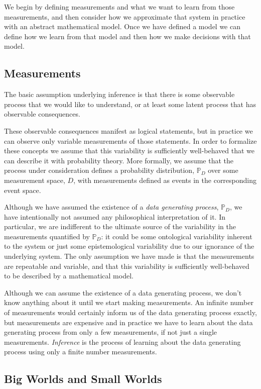 \documentclass[11pt, oneside]{article}
\newcommand{\PP}{ \mathbb{P} }
\begin{document}
We begin by defining measurements and what we want
to learn from those measurements, and then consider how
we approximate that system in practice with an abstract
mathematical model.  Once we have defined a model we
can define how we learn from that model and then how
we make decisions with that model.

\subsection{Measurements}

The basic assumption underlying inference is that there is some
observable process that we would like to understand, or at least
some latent process that has observable consequences.

These observable consequences manifest as logical statements,
but in practice we can observe only variable measurements
of those statements.  In order to formalize these concepts we
assume that this variability is sufficiently well-behaved that we
can describe it with probability theory.  More formally, we assume
that the process under consideration defines a probability 
distribution, $\PP_{D}$ over some measurement space, $D$, 
with measurements defined as events in the corresponding
event space.  

Although we have assumed the existence of a \emph{data
generating process}, $\PP_{D}$, we have intentionally not
assumed any philosophical interpretation of it.  In particular, we
are indifferent to the ultimate source of the variability in the
measurements quantified by $\PP_{D}$: it could be some
ontological variability inherent to the system or just some
epistemological variability due to our ignorance of the underlying 
system.  The only assumption we have made is that the
measurements are repeatable and variable, and that this
variability is sufficiently well-behaved to be described by a 
mathematical model. 

Although we can assume the existence of a data generating 
process, we don't know anything about it until we start making 
measurements.  An infinite number of measurements would 
certainly inform us of the data generating process exactly,
but measurements are expensive and in practice we have
to learn about the data generating process from only a few
measurements, if not just a single measurements. \emph{Inference}
is the process of learning about the data generating process
using only a finite number measurements.  

\subsection{Big Worlds and Small Worlds}
\end{document}
